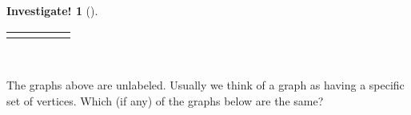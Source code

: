 \documentclass[10pt,]{book}
\theoremstyle{plain}
\theoremstyle{definition}
\theoremstyle{definition}
\theoremstyle{definition}
\newtheorem{investigation}[project]{Investigate!}
\theoremstyle{definition}
\numberwithin{equation}{chapter}
\newlength{\panelmax}
\newcommand{\vtx}[2]{node[fill,circle,inner sep=0pt, minimum size=4pt,label=#1:#2]{}}
\renewcommand{\v}{\vtx{above}{}}
\begin{document}
\begin{investigation}[]
{\begin{lrbox}{\panelboxEimage}
{{
}
}\end{lrbox}
\ifdefined\phEimage\else\newlength{\phEimage}\fi%
\setlength{\phEimage}{\ht\panelboxEimage+\dp\panelboxEimage}
\settototalheight{\phEimage}{\usebox{\panelboxEimage}}
\setlength{\panelmax}{\maxof{\panelmax}{\phEimage}}
\leavevmode%
\setlength{\tabcolsep}{0.01\linewidth}
\par\medskip\noindent
\hspace*{0.01\linewidth}%
\begin{tabular}{@{}*{5}{c}@{}}
\begin{minipage}[c][\panelmax][b]{0.18\linewidth}\usebox{\panelboxAimage}\end{minipage}&
\begin{minipage}[c][\panelmax][b]{0.18\linewidth}\usebox{\panelboxBimage}\end{minipage}&
\begin{minipage}[c][\panelmax][b]{0.18\linewidth}\usebox{\panelboxCimage}\end{minipage}&
\begin{minipage}[c][\panelmax][b]{0.18\linewidth}\usebox{\panelboxDimage}\end{minipage}&
\begin{minipage}[c][\panelmax][b]{0.18\linewidth}\usebox{\panelboxEimage}\end{minipage}\end{tabular}\\
}%
\par
\hypertarget{p-1470}{}%
The graphs above are unlabeled. Usually we think of a graph as having a specific set of vertices. Which (if any) of the graphs below are the same?%
{%
\setlength{\panelmax}{0pt}
\ifdefined\panelboxAimage\else\newsavebox{\panelboxAimage}\fi%
\begin{lrbox}{\panelboxAimage}
\end{lrbox}}
\end{investigation}
\end{document}
